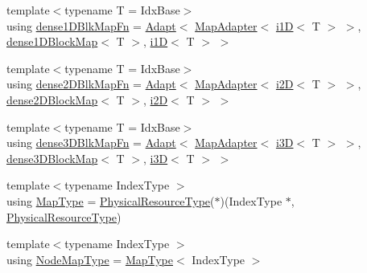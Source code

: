 \begin{DoxyCompactItemize}
\item 
{\footnotesize template$<$typename T  = Idx\+Base$>$ }\\using \hyperlink{namespacevt_1_1mapping_aa1117076bb1d73ecb84905dc391c0528}{dense1\+D\+Blk\+Map\+Fn} = \hyperlink{namespacevt_1_1mapping_aafe187035ce8df02f31983e37cdb6a5d}{Adapt}$<$ \hyperlink{namespacevt_1_1mapping_a41b113c28bb6430fbcb5be66e08ccf9f}{Map\+Adapter}$<$ \hyperlink{namespacevt_1_1mapping_af0c14a9a77e0311b3d089143ed93ba76}{i1D}$<$ T $>$ $>$, \hyperlink{namespacevt_1_1mapping_a2d49151f03d4ce393b01c620f6b18517}{dense1\+D\+Block\+Map}$<$ T $>$, \hyperlink{namespacevt_1_1mapping_af0c14a9a77e0311b3d089143ed93ba76}{i1D}$<$ T $>$ $>$
\item 
{\footnotesize template$<$typename T  = Idx\+Base$>$ }\\using \hyperlink{namespacevt_1_1mapping_a528ef51db9f74e1bb6258a161b329873}{dense2\+D\+Blk\+Map\+Fn} = \hyperlink{namespacevt_1_1mapping_aafe187035ce8df02f31983e37cdb6a5d}{Adapt}$<$ \hyperlink{namespacevt_1_1mapping_a41b113c28bb6430fbcb5be66e08ccf9f}{Map\+Adapter}$<$ \hyperlink{namespacevt_1_1mapping_a6448c875e0807b43f31e96fc5b0cec04}{i2D}$<$ T $>$ $>$, \hyperlink{namespacevt_1_1mapping_aca20bcd20c24f4a43e217ca63bf5812c}{dense2\+D\+Block\+Map}$<$ T $>$, \hyperlink{namespacevt_1_1mapping_a6448c875e0807b43f31e96fc5b0cec04}{i2D}$<$ T $>$ $>$
\item 
{\footnotesize template$<$typename T  = Idx\+Base$>$ }\\using \hyperlink{namespacevt_1_1mapping_a20b151291c38fe5008608b65f28759ac}{dense3\+D\+Blk\+Map\+Fn} = \hyperlink{namespacevt_1_1mapping_aafe187035ce8df02f31983e37cdb6a5d}{Adapt}$<$ \hyperlink{namespacevt_1_1mapping_a41b113c28bb6430fbcb5be66e08ccf9f}{Map\+Adapter}$<$ \hyperlink{namespacevt_1_1mapping_af435b967b9ed1ccb5ec4effdbd9abd13}{i3D}$<$ T $>$ $>$, \hyperlink{namespacevt_1_1mapping_a91764d84e5e6d8253872740cb8424726}{dense3\+D\+Block\+Map}$<$ T $>$, \hyperlink{namespacevt_1_1mapping_af435b967b9ed1ccb5ec4effdbd9abd13}{i3D}$<$ T $>$ $>$
\item 
{\footnotesize template$<$typename Index\+Type $>$ }\\using \hyperlink{namespacevt_1_1mapping_a443f8bb8920af5ae1d3391f61fe492a6}{Map\+Type} = \hyperlink{namespacevt_a2dc36fcada816dc6d11774d650328ee9}{Physical\+Resource\+Type}($\ast$)(Index\+Type $\ast$, \hyperlink{namespacevt_a2dc36fcada816dc6d11774d650328ee9}{Physical\+Resource\+Type})
\item 
{\footnotesize template$<$typename Index\+Type $>$ }\\using \hyperlink{namespacevt_1_1mapping_a8dbe779cb3e28ed8c424bcc8826765b9}{Node\+Map\+Type} = \hyperlink{namespacevt_1_1mapping_a443f8bb8920af5ae1d3391f61fe492a6}{Map\+Type}$<$ Index\+Type $>$

\end{DoxyCompactItemize}
